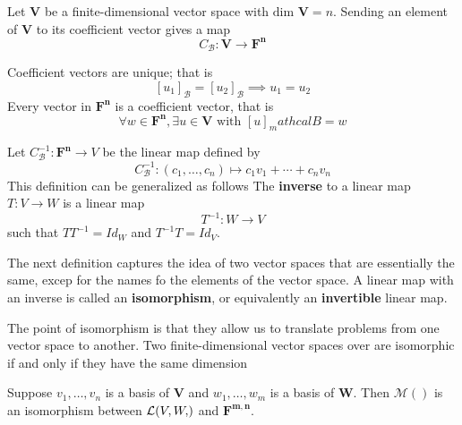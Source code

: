 \documentclass[11pt]{article} %
\newcommand\F[1]{\text{$\mathbf{F^{#1}}$}}
\newcommand\M[1]{\text{$\mathcal{M}(#1)$}}
\newcommand\V{\text{$\mathbf{V}$}}
\newcommand\W{\text{$\mathbf{W}$}}
\newcommand\0{\text{$\mathbf{0}$}}
\renewcommand\L[2]{\mathcal{L}(#1,#2)}
\newcommand\lc[3]{#1_1 #2_1 + \cdots + #1_{#3} #2_{#3}}
\newcommand\ls[2]{#1_1, \ldots, #1_{#2}}
\renewcommand\dim{\text{dim }}
\begin{document}
{
Let $\V$ be a finite-dimensional vector space with $\dim \V = n$. Sending an element of $\V$ to its coefficient vector gives a map
$$
C_\mathcal{B} : \V \to \F{n}
$$
}

{
\points
{Coefficient vectors are unique; that is$$[u_1]_\mathcal{B} = [u_2]_\mathcal{B} \implies u_1 = u_2$$}
{Every vector in $\F{n}$ is a coefficient vector, that is $$\forall w \in \F{n}, \exists u \in \V \text{ with } [u]_mathcal{B} = w$$}
}

{Let $C^{-1}_\mathcal{B}: \F{n} \to V$ be the linear map defined by
$$
C^{-1}_\mathcal{B} : (\ls cn) \mapsto \lc cvn 
$$
}
This definition can be generalized as follows
{The \textbf{inverse} to a linear map $T : V \to W$ is a linear map $$T^{-1} : W \to V$$such that $TT^{-1} = Id_W$ and $T^{-1}T = Id_V$.}

The next definition captures the idea of two vector spaces that are essentially the same, excep for the names fo the elements of the vector space.
{A linear map with an inverse is called an \textbf{isomorphism}, or equivalently an \textbf{invertible} linear map.}

The point of isomorphism is that they allow us to translate problems from one vector space to another.
{Two finite-dimensional vector spaces over \F{} are isomorphic if and only if they have the same dimension}
{}

\theorem{$\L{V, W}$ and $\F{m,n}$ are isomorphic}
{Suppose $\ls vn$ is a basis of $\V$ and $\ls wm$ is a basis of $\W$. Then $\M{}$ is an isomorphism between $\L{V,W}$ and $\F{m,n}$.}
{}
\end{document}
